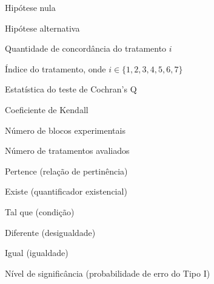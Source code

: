 \begin{simbolos}
  \item[$ H_0 $] Hipótese nula
  \item[$ H_1 $] Hipótese alternativa
  \item[$ A_i $] Quantidade de concordância do tratamento $i$
  \item[$ i $] Índice do tratamento, onde $i \in \{1,2,3,4,5,6,7\}$
  \item[$ Q $] Estatística do teste de Cochran's Q
  \item[$ W $] Coeficiente de Kendall
  \item[$ n $] Número de blocos experimentais
  \item[$ k $] Número de tratamentos avaliados
  \item[$ \in $] Pertence (relação de pertinência)
  \item[$ \exists $] Existe (quantificador existencial)
  \item[$ \mid $] Tal que (condição)
  \item[$ \neq $] Diferente (desigualdade)
  \item[$ = $] Igual (igualdade)
  \item[$\alpha$] Nível de significância (probabilidade de erro do Tipo I)

\end{simbolos}
